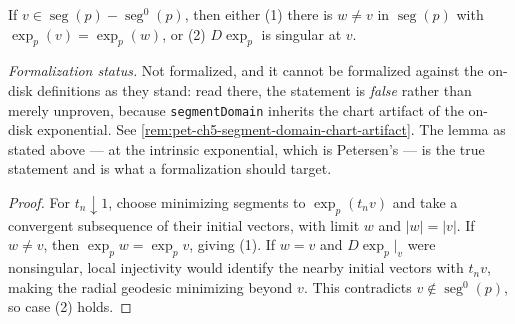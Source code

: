 \begin{lemma}
  \label{lem:pet-ch5-cut-locus-characterization}
  \notready
  \notready
  If $v\in\operatorname{seg}(p)-\operatorname{seg}^0(p)$, then either (1) there is
  $w\ne v$ in $\operatorname{seg}(p)$ with $\exp_p(v)=\exp_p(w)$, or (2) $D\exp_p$
  is singular at $v$.

  \emph{Formalization status.} Not formalized, and it cannot be formalized against
  the on-disk definitions as they stand: read there, the statement is \emph{false}
  rather than merely unproven, because \texttt{segmentDomain} inherits the chart
  artifact of the on-disk exponential. See
  \cref{rem:pet-ch5-segment-domain-chart-artifact}. The lemma as stated above — at
  the intrinsic exponential, which is Petersen's — is the true statement and is what
  a formalization should target.
\end{lemma}
\begin{proof}
  \sketch
  For $t_n\downarrow1$, choose minimizing segments to $\exp_p(t_nv)$ and take a
  convergent subsequence of their initial vectors, with limit $w$ and $|w|=|v|$.
  If $w\ne v$, then $\exp_pw=\exp_pv$, giving (1).  If $w=v$ and $D\exp_p|_v$ were
  nonsingular, local injectivity would identify the nearby initial vectors with
  $t_nv$, making the radial geodesic minimizing beyond $v$.  This contradicts
  $v\notin\operatorname{seg}^0(p)$, so case (2) holds.
\end{proof}

